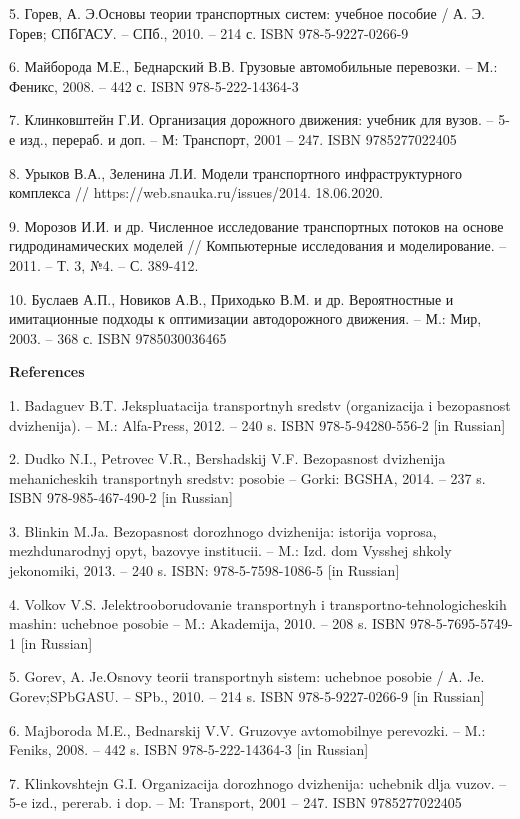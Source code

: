 5. Горев, А. Э.Основы теории транспортных систем: учебное пособие / А.
Э. Горев; СПбГАСУ. -- СПб., 2010. -- 214 с. ISBN 978-5-9227-0266-9

6. Майборода М.Е., Беднарский В.В. Грузовые автомобильные перевозки. --
М.: Феникс, 2008. -- 442 с. ISBN 978-5-222-14364-3

7. Клинковштейн Г.И. Организация дорожного движения: учебник для вузов.
-- 5-е изд., перераб. и доп. -- М: Транспорт, 2001 -- 247. ISBN
9785277022405

8. Урыков В.А., Зеленина Л.И. Модели транспортного инфраструктурного
комплекса // https://web.snauka.ru/issues/2014. 18.06.2020.

9. Морозов И.И. и др. Численное исследование транспортных потоков на
основе гидродинамических моделей // Компьютерные исследования и
моделирование. -- 2011. -- Т. 3, №4. -- С. 389-412.

10. Буслаев А.П., Новиков А.В., Приходько В.М. и др. Вероятностные и
имитационные подходы к оптимизации автодорожного движения. -- М.: Мир,
2003. -- 368 с. ISBN 9785030036465

{\bfseries References}

1. Badaguev B.T. Jekspluatacija transportnyh sredstv (organizacija i
bezopasnost\textquotesingle{} dvizhenija). -- M.:
Al\textquotesingle fa-Press, 2012. -- 240 s. ISBN 978-5-94280-556-2
{[}in Russian{]}

2. Dudko N.I., Petrovec V.R., Bershadskij V.F.
Bezopasnost\textquotesingle{} dvizhenija mehanicheskih transportnyh
sredstv: posobie -- Gorki: BGSHA, 2014. -- 237 s. ISBN 978-985-467-490-2
{[}in Russian{]}

3. Blinkin M.Ja. Bezopasnost\textquotesingle{} dorozhnogo dvizhenija:
istorija voprosa, mezhdunarodnyj opyt, bazovye institucii. -- M.: Izd.
dom Vysshej shkoly jekonomiki, 2013. -- 240 s. ISBN: 978-5-7598-1086-5
{[}in Russian{]}

4. Volkov V.S. Jelektrooborudovanie transportnyh i
transportno-tehnologicheskih mashin: uchebnoe posobie -- M.: Akademija,
2010. -- 208 s. ISBN 978-5-7695-5749-1 {[}in Russian{]}

5. Gorev, A. Je.Osnovy teorii transportnyh sistem: uchebnoe posobie / A.
Je. Gorev;SPbGASU. -- SPb., 2010. -- 214 s. ISBN 978-5-9227-0266-9 {[}in
Russian{]}

6. Majboroda M.E., Bednarskij V.V. Gruzovye
avtomobil\textquotesingle nye perevozki. -- M.: Feniks, 2008. -- 442 s.
ISBN 978-5-222-14364-3 {[}in Russian{]}

7. Klinkovshtejn G.I. Organizacija dorozhnogo dvizhenija: uchebnik dlja
vuzov. -- 5-e izd., pererab. i dop. -- M: Transport, 2001 -- 247. ISBN
9785277022405

